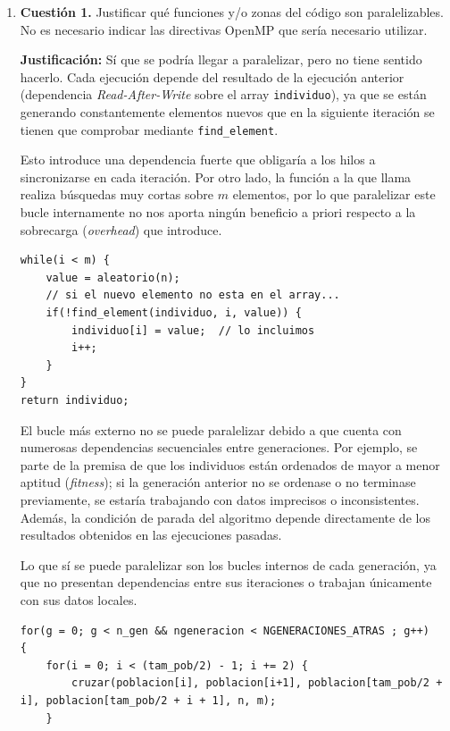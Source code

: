 \documentclass[12pt]{article}
\begin{document}
\begin{enumerate}
	\item \textbf{Cuestión 1.} Justificar qué funciones y/o zonas del código son paralelizables. No es necesario indicar las directivas OpenMP que sería necesario utilizar.


\textbf{Justificación:} Sí que se podría llegar a paralelizar, pero no tiene sentido hacerlo. Cada ejecución depende del resultado de la ejecución anterior (dependencia \textit{Read-After-Write} sobre el array \texttt{individuo}), ya que se están generando constantemente elementos nuevos que en la siguiente iteración se tienen que comprobar mediante \texttt{find\_element}.

Esto introduce una dependencia fuerte que obligaría a los hilos a sincronizarse en cada iteración. Por otro lado, la función a la que llama realiza búsquedas muy cortas sobre $m$ elementos, por lo que paralelizar este bucle internamente no nos aporta ningún beneficio a priori respecto a la sobrecarga (\textit{overhead}) que introduce.

\begin{lstlisting}[style=EstiloC]
while(i < m) {
    value = aleatorio(n);
    // si el nuevo elemento no esta en el array...
    if(!find_element(individuo, i, value)) {
        individuo[i] = value;  // lo incluimos
        i++;
    }
}
return individuo;
\end{lstlisting}

\vspace{0.5cm}

El bucle más externo no se puede paralelizar debido a que cuenta con numerosas dependencias secuenciales entre generaciones. Por ejemplo, se parte de la premisa de que los individuos están ordenados de mayor a menor aptitud (\textit{fitness}); si la generación anterior no se ordenase o no terminase previamente, se estaría trabajando con datos imprecisos o inconsistentes. Además, la condición de parada del algoritmo depende directamente de los resultados obtenidos en las ejecuciones pasadas.

Lo que sí se puede paralelizar son los bucles internos de cada generación, ya que no presentan dependencias entre sus iteraciones o trabajan únicamente con sus datos locales.

\begin{lstlisting}[style=EstiloC]
for(g = 0; g < n_gen && ngeneracion < NGENERACIONES_ATRAS ; g++)
{
    for(i = 0; i < (tam_pob/2) - 1; i += 2) {
        cruzar(poblacion[i], poblacion[i+1], poblacion[tam_pob/2 + i], poblacion[tam_pob/2 + i + 1], n, m);
    }
    

\end{lstlisting}
\end{enumerate}
\end{document}
